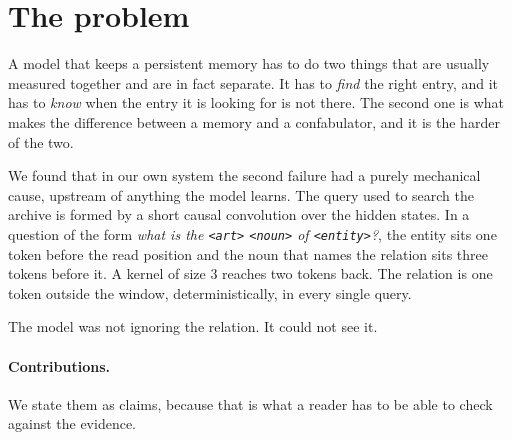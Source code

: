 \documentclass[11pt,a4paper]{article}
\begin{document}
\section{The problem}

A model that keeps a persistent memory has to do two things that are usually measured together and are
in fact separate. It has to \emph{find} the right entry, and it has to \emph{know} when the entry it is
looking for is not there. The second one is what makes the difference between a memory and a
confabulator, and it is the harder of the two.

We found that in our own system the second failure had a purely mechanical cause, upstream of anything
the model learns. The query used to search the archive is formed by a short causal convolution over the
hidden states. In a question of the form \emph{what is the \texttt{<art>} \texttt{<noun>} of
\texttt{<entity>}?}, the entity sits one token before the read position and the noun that names the
relation sits three tokens before it. A kernel of size $3$ reaches two tokens back. The relation is one
token outside the window, deterministically, in every single query.

The model was not ignoring the relation. It could not see it.


\paragraph{Contributions.} We state them as claims, because that is what a reader has to be able to
check against the evidence.
\end{document}
